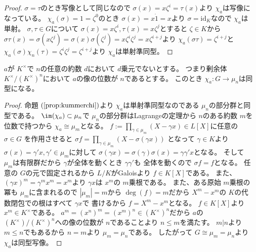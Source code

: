 \documentclass[../master_galois_theory]{subfiles}
\begin{document}
\begin{proof}
  $\sigma = \tau$のとき写像として同じなので $\sigma(x) = x \zeta^i = \tau(x)$より $\chi_a$は写像になっている。
  $\chi_a(\sigma) = 1 = \zeta^0$のとき $\sigma(x) = x \dot 1 = x$より
  $\sigma = \mathrm{id}_K$なので $\chi_a$は単射。
  $\sigma , \tau \in G$について $\sigma(x) = x \zeta^i , \tau(x) = x \zeta^j$とすると $\zeta \in K$から
  $\sigma \tau(x) = \sigma(x \zeta^j) = \sigma(x) \sigma(\zeta^j) = x \zeta^i \zeta^j = x \zeta^{i + j}$より
  $\chi_a(\sigma \tau) = \zeta^{i + j}$と
  $\chi_a(\sigma) \chi_n(\tau) = \zeta^i \zeta^j = \zeta^{i + j}$より
  $\chi_a$は単射準同型。
\end{proof}

\begin{corl}
  $a$が $K^\times$で $n$の任意の約数 $d$において $d$乗元でないとする。
  つまり剰余体 $K^\times/(K^\times)^n$において $a$の像の位数が $n$であるとする。
  このとき $\chi_a : G \longrightarrow \mu_n$は同型になる。
\end{corl}

\begin{proof}
  命題 $(\mathrm{\ref{prop:kummerchi}})$より $\chi_a$は単射準同型なのである $\mu_n$の部分群と同型である。
  $\im(\chi_a) \subset \mu_n$で $\mu_n$の部分群は\rm{Lagrange}の定理から
  $n$のある約数 $m$を位数で持つから $\chi_a \cong \mu_m$となる。
  $f := \prod_{\gamma \in \mu_m}(X - \gamma x) \in L[X]$に任意の $\sigma \in G$
  を作用させると $\sigma f = \prod_{\gamma \in \mu_m}(X - \sigma(\gamma x))$
  となって $\gamma \in K$より $\sigma(x) = \gamma' x , \gamma' \in \mu_m$に対して
  $\sigma(\gamma x) = \sigma(\gamma) \sigma(x) = \gamma \gamma' x$となる。
  そして $\mu_m$は有限群だから $\gamma$が全体を動くとき $\gamma \gamma'$も
  全体を動くので $\sigma f = f$となる。
  任意の $G$の元で固定されるから $L/K$が\rm{Galois}より $f \in K[X]$である。
  また、 $(\gamma x)^m = \gamma^m x^m = x^m$より $\gamma x$は $x^m$の
  $m$乗根である。
  また、ある原始 $m$乗根の冪も $\mu_m$に含まれるので $|\mu_m| = m$から
  $\deg(f) = m$だから $X^m - x^m$の $K$の代数閉包での根はすべて $\gamma x$で
  書けるから $f = X^m - x^m$となる。
  $f \in K[X]$より $x^m \in K^\times$である。
  $a^m = (x^n)^m = (x^m)^n \in (K^\times)^n$だから
  $a$の $(K^\times)/(K^\times)^n$への像の位数が $n$であることより
  $n \leq m$を満たす。
  $m | n$より $m \leq n$でもあるから $n = m$より $\mu_m = \mu_n$である。
  したがって $G \cong \mu_m = \mu_n$より $\chi_a$は同型写像。
\end{proof}
\end{document}
